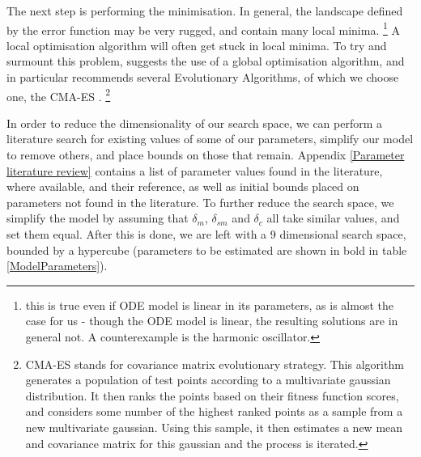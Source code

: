 \documentclass[10pt,journal]{./IEEE_latex_class/IEEEtran}
\begin{document}
The next step is performing the minimisation. In general, the landscape defined by the error function may be very rugged, and contain many local minima. \footnote{this is true even if ODE model is linear in its parameters, as is almost the case for us - though the ODE model is linear, the resulting solutions are in general not. A counterexample is the harmonic oscillator.} A local optimisation algorithm will often get stuck in local minima. To try and surmount this problem, \cite{Algorithms2003} suggests the use of a global optimisation algorithm, and in particular recommends several Evolutionary Algorithms, of which we choose one, the CMA-ES \cite{Hansen2006,Hansen2011}. \footnote{CMA-ES stands for covariance matrix evolutionary strategy. This algorithm generates a population of test points according to a multivariate gaussian distribution. It then ranks the points based on their fitness function scores, and  considers some number of the highest ranked points as a sample from a new multivariate gaussian. Using this sample, it then estimates a new mean and covariance matrix for this gaussian and the process is iterated.}

In order to reduce the dimensionality of our search space, we can perform a literature search for existing values of some of our parameters, simplify our model to remove others, and place bounds on those that remain. Appendix \ref{Parameter literature review} contains a list of parameter values found in the literature, where available, and their reference, as well as initial bounds placed on parameters not found in the literature. To further reduce the search space, we simplify the model by assuming that $\delta_m$, $\delta_{sm}$ and $\delta_c$ all take similar values, and set them equal. After this is done, we are left with a 9 dimensional search space, bounded by a hypercube (parameters to be estimated are shown in bold in table \ref{ModelParameters}).
\end{document}
